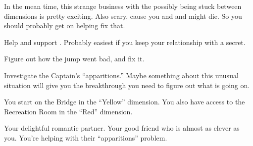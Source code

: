 \documentclass[char]{TMFHope}
\begin{document}
In the mean time, this strange business with the \pNew{} possibly being stuck between dimensions is pretty exciting. Also scary, cause you and \cMed{} and \cXO{} might die. So you should probably get on helping fix that.



\begin{itemz}[Goals]
	\item Help and support \cXO{}. Probably easiest if you keep your relationship with \cXO{\them} a secret.
	\item Figure out how the jump went bad, and fix it.
	\item Investigate the Captain's ``apparitions.''  Maybe something about this unusual situation will give you the breakthrough you need to figure out what is going on.
\end{itemz}

\begin{itemz}[Notes]
	\item You start on the Bridge in the ``Yellow'' dimension. You also have access to the Recreation Room in the ``Red'' dimension.
\end{itemz}

\begin{contacts}
	\contact{\cXO{}} Your delightful romantic partner. 
	\contact{\cMed{}} Your good friend who is almost as clever as you.
	\contact{\cCap{}}You're helping  with their ``apparitions'' problem.
\end{contacts}
\end{document}
